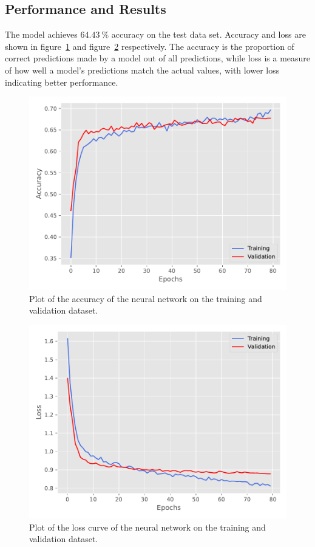 \documentclass[
  12pt,
  bibliography=totoc,     %
  captions=tableheading,  %
  titlepage=firstiscover, %
]{scrartcl}
\begin{document}
\subsection{Performance and Results}
The model achieves $\SI{64.43}{\percent}$ accuracy on the test data set. Accuracy and loss are shown in figure~\ref{fig:nn_acc} and figure~\ref{fig:nn_loss} respectively.
The accuracy is the proportion of correct predictions made by a model out of all predictions, while loss is a measure of how well a model's predictions match the actual
values, with lower loss indicating better performance.
\FloatBarrier
\begin{figure}[H]
  \centering
  \includegraphics[scale=0.6]{figures/NN/Acc.pdf}
  \caption{Plot of the accuracy of the neural network on the training and validation dataset.}
  \label{fig:nn_acc}
\end{figure}
\begin{figure}[ht]
  \centering
  \includegraphics[scale=0.6]{figures/NN/Loss.pdf}
  \caption{Plot of the loss curve of the neural network on the training and validation dataset.}
  \label{fig:nn_loss}
\end{figure}
\end{document}
